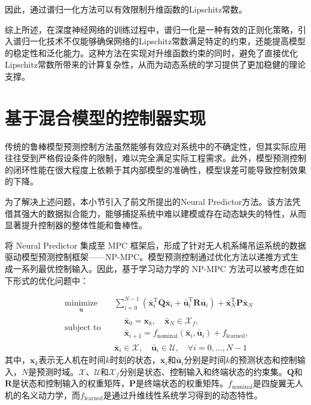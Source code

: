 \documentclass[lang=chs, degree=master, blindreview=true, winfonts=true]{yanputhesis}
\begin{document}
	因此，通过谱归一化方法可以有效限制升维函数的Lipschitz常数。

综上所述，在深度神经网络的训练过程中，谱归一化是一种有效的正则化策略，引入谱归一化技术不仅能够确保网络的Lipschitz常数满足特定的约束，还能提高模型的稳定性和泛化能力。这种方法在实现对升维函数约束的同时，避免了直接优化Lipschitz常数所带来的计算复杂性，从而为动态系统的学习提供了更加稳健的理论支撑。

\section{基于混合模型的控制器实现}

传统的鲁棒模型预测控制方法虽然能够有效应对系统中的不确定性，但其实际应用往往受到严格假设条件的限制，难以完全满足实际工程需求。此外，模型预测控制的闭环性能在很大程度上依赖于其内部模型的准确性，模型误差可能导致控制效果的下降。

为了解决上述问题，本小节引入了前文所提出的Neural Predictor方法。该方法凭借其强大的数据拟合能力，能够捕捉系统中难以建模或存在动态缺失的特性，从而显著提升控制器的整体性能和鲁棒性。

将 Neural Predictor 集成至 MPC 框架后，形成了针对无人机系绳吊运系统的数据驱动模型预测控制框架——NP-MPC。模型预测控制通过优化方法以递推方式生成一系列最优控制输入。因此，基于学习动力学的 NP-MPC 方法可以被考虑在如下形式的优化问题中：

\begin{equation}
	\begin{aligned} \label{nmpc}
		&\operatorname*{minimize}_{\bm{\bar{u}}}& & \sum_{i=0}^{N-1}\left(\bm{\bar{x}}_i^\mathrm{T}\bm{Q}\bm{\bar{x}}_i + \bm{\bar{u}}_i^\mathrm{T}\bm{R}\bm{\bar{u}}_i\right) + \bm{\bar{x}}_N^\mathrm{T}\bm{P}\bm{\bar{x}}_N  \\
		&\text{subject to}& & \begin{aligned}
			&\bm{\bar{x}}_{0} = \bm{x}_k, \quad \bm{\bar{x}}_{N} \in \mathcal{X}_f, \\
			&\bm{\bar{x}}_{i+1} = {f}_{\text{nominal}}(\bm{\bar{x}}_i, \bm{\bar{u}}_i) + {f}_{\text{learned}},
		\end{aligned} \\
		&&& \bm{\bar{x}}_i \in \mathcal{X}, \quad \bm{\bar{u}}_i \in \mathcal{U}, \quad \forall i = 0, \ldots, N-1
	\end{aligned}
\end{equation}
其中，$\bm{x}_k$表示无人机在时间$k$时刻的状态，$\bm{\bar{x}}_i$和$\bm{\bar{u}}_i$分别是时间$k$的预测状态和控制输入，$N$是预测时域。$\mathcal{X}$、$\mathcal{U}$和$\mathcal{X}_f$分别是状态、控制输入和终端状态的约束集。$\bm{Q}$和$\bm{R}$是状态和控制输入的权重矩阵，$\bm{P}$是终端状态的权重矩阵。${f}_{\text{nominal}}$是四旋翼无人机的名义动力学，而${f}_{\text{learned}}$是通过升维线性系统学习得到的动态特性。
\end{document}
